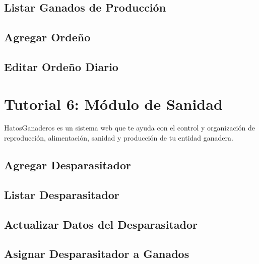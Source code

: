 \documentclass[letterpaper,10pt,english]{sphinxmanual}
\begin{document}
\subsection{Listar Ganados de Producción}
\label{Tutorial 5: M_xf3dulo de Producci_xf3n:listar-ganados-de-produccion}

\subsection{Agregar Ordeño}
\label{Tutorial 5: M_xf3dulo de Producci_xf3n:agregar-ordeno}

\subsection{Editar Ordeño Diario}
\label{Tutorial 5: M_xf3dulo de Producci_xf3n:editar-ordeno-diario}

\section{Tutorial 6: Módulo de Sanidad}
\label{Tutorial 6: M_xf3dulo de Sanidad:tutorial-6-modulo-de-sanidad}\label{Tutorial 6: M_xf3dulo de Sanidad::doc}
HatosGanaderos es un sistema web que te ayuda con el control y organización de reproducción, alimentación, sanidad y producción de tu entidad ganadera.


\subsection{Agregar Desparasitador}
\label{Tutorial 6: M_xf3dulo de Sanidad:agregar-desparasitador}

\subsection{Listar Desparasitador}
\label{Tutorial 6: M_xf3dulo de Sanidad:listar-desparasitador}

\subsection{Actualizar Datos del Desparasitador}
\label{Tutorial 6: M_xf3dulo de Sanidad:actualizar-datos-del-desparasitador}

\subsection{Asignar Desparasitador a Ganados}
\label{Tutorial 6: M_xf3dulo de Sanidad:asignar-desparasitador-a-ganados}
\end{document}
